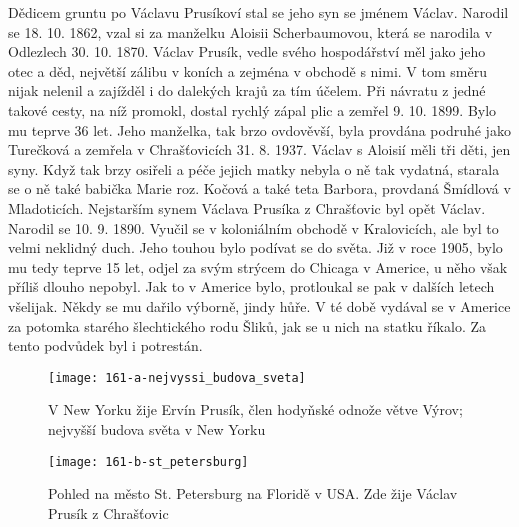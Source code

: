 \documentclass[../dejiny-rodu-prusiku.tex]{subfiles}
\begin{document}
Dědicem gruntu po Václavu Prusíkoví stal se jeho syn se jménem Václav. Narodil se 18. 10. 1862, vzal si za manželku Aloisii Scherbaumovou, která se narodila v Odlezlech 30. 10. 1870. Václav Prusík, vedle svého hospodářství měl jako jeho otec a děd, největší zálibu v koních a zejména v obchodě s nimi. V tom směru nijak nelenil a zajížděl i do dalekých krajů za tím účelem. Při návratu z jedné takové cesty, na níž promokl, dostal rychlý zápal plic a zemřel 9. 10. 1899. Bylo mu teprve 36 let. Jeho manželka, tak brzo ovdověvší, byla provdá­na podruhé jako Turečková a zemřela v Chrašťovicích 31. 8. 1937. Václav s Aloisií měli tři děti, jen syny. Když tak brzy osiřeli a péče jejich matky nebyla o ně tak vydatná, starala se o ně také babička Marie roz. Kočová a také teta Barbora, provdaná Šmídlová v Mladoticích. Nejstarším synem Václava Prusíka z Chrašťovic byl opět Václav. Narodil se 10. 9. 1890. Vyučil se v koloniálním obchodě v Kralovicích, ale byl to velmi neklidný duch. Jeho touhou bylo podívat se do světa. Již v roce 1905, bylo mu tedy teprve 15 let, odjel za svým strýcem do Chicaga v Americe, u něho však příliš dlouho nepobyl. Jak to v Americe bylo, protloukal se pak v dalších letech všelijak. Někdy se mu dařilo výborně, jindy hůře. V té době vydával se v Americe za potomka starého šlechtického rodu Šliků, jak se u nich na statku říkalo. Za tento podvůdek byl i potrestán.

\begin{figure}
\centering
\texttt{[image: 161-a-nejvyssi\_budova\_sveta]}
\caption{V New Yorku žije Ervín Prusík, člen hodyňské odnože větve Výrov; nejvyšší budova světa v New Yorku}
\label{fig:161-a-nejvyssi_budova_sveta}
\end{figure}

\begin{figure}
\centering
\texttt{[image: 161-b-st\_petersburg]}
\caption{Pohled na město St. Petersburg na Floridě v USA. Zde žije Václav Prusík z Chrašťovic}
\label{fig:161-b-st_petersburg}
\end{figure}
\end{document}
